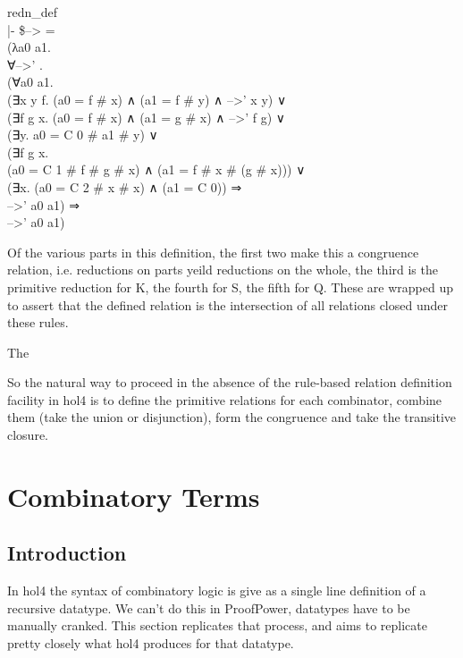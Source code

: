 \begin{GFT}{}
\+    redn\_def\\
\+    |- \$--> =\\
\+       (λa0 a1.\\
\+          ∀-->' .\\
\+            (∀a0 a1.\\
\+               (∃x y f. (a0 = f \# x) ∧ (a1 = f \# y) ∧ -->' x y) ∨\\
\+               (∃f g x. (a0 = f \# x) ∧ (a1 = g \# x) ∧ -->' f g) ∨\\
\+               (∃y. a0 = C 0 \# a1 \# y) ∨\\
\+               (∃f g x.\\
\+                  (a0 = C 1 \# f \# g \# x) ∧ (a1 = f \# x \# (g \# x))) ∨\\
\+               (∃x. (a0 = C 2 \# x \# x) ∧ (a1 = C 0)) ⇒\\
\+               -->' a0 a1) ⇒\\
\+            -->' a0 a1)\\
\end{GFT}

Of the various parts in this definition, the first two make this a congruence relation, i.e. reductions on parts yeild reductions on the whole, the third is the primitive reduction for K, the fourth for S, the fifth for Q.
These are wrapped up to assert that the defined relation is the intersection of all relations closed under these rules.

The


So the natural way to proceed in the absence of the rule-based relation definition facility in hol4 is to define the primitive relations for each combinator, combine them (take the union or disjunction), form the congruence and take the transitive closure.


\section{Combinatory Terms}

\subsection{Introduction}

In hol4 the syntax of combinatory logic is give as a single line definition of a recursive datatype.
We can't do this in ProofPower, datatypes have to be manually cranked.
This section replicates that process, and aims to replicate pretty closely what hol4 produces for that datatype.

